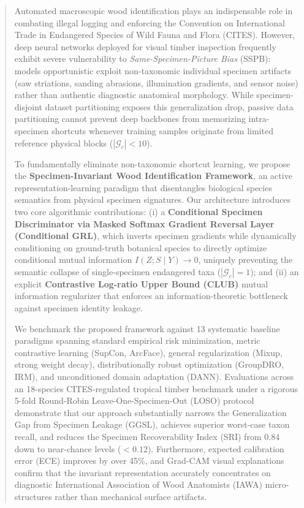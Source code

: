 \documentclass[a4paper,fleqn]{cas-sc}
\begin{document}
\begin{abstract}
Automated macroscopic wood identification plays an indispensable role in combating illegal logging and enforcing the Convention on International Trade in Endangered Species of Wild Fauna and Flora (CITES). However, deep neural networks deployed for visual timber inspection frequently exhibit severe vulnerability to \emph{Same-Specimen-Picture Bias} (SSPB): models opportunistic exploit non-taxonomic individual specimen artifacts (saw striations, sanding abrasions, illumination gradients, and sensor noise) rather than authentic diagnostic anatomical morphology. While specimen-disjoint dataset partitioning exposes this generalization drop, passive data partitioning cannot prevent deep backbones from memorizing intra-specimen shortcuts whenever training samples originate from limited reference physical blocks ($|\mathcal{G}_c| < 10$). 

To fundamentally eliminate non-taxonomic shortcut learning, we propose the \textbf{Specimen-Invariant Wood Identification Framework}, an active representation-learning paradigm that disentangles biological species semantics from physical specimen signatures. Our architecture introduces two core algorithmic contributions: (i) a \textbf{Conditional Specimen Discriminator via Masked Softmax Gradient Reversal Layer (Conditional GRL)}, which inverts specimen gradients while dynamically conditioning on ground-truth botanical species to directly optimize conditional mutual information $I(Z; S \mid Y) \to 0$, uniquely preventing the semantic collapse of single-specimen endangered taxa ($|\mathcal{G}_c| = 1$); and (ii) an explicit \textbf{Contrastive Log-ratio Upper Bound (CLUB)} mutual information regularizer that enforces an information-theoretic bottleneck against specimen identity leakage. 

We benchmark the proposed framework against 13 systematic baseline paradigms spanning standard empirical risk minimization, metric contrastive learning (SupCon, ArcFace), general regularization (Mixup, strong weight decay), distributionally robust optimization (GroupDRO, IRM), and unconditioned domain adaptation (DANN). Evaluations across an 18-species CITES-regulated tropical timber benchmark under a rigorous 5-fold Round-Robin Leave-One-Specimen-Out (LOSO) protocol demonstrate that our approach substantially narrows the Generalization Gap from Specimen Leakage ($\mathrm{GGSL}$), achieves superior worst-case taxon recall, and reduces the Specimen Recoverability Index ($\mathrm{SRI}$) from $0.84$ down to near-chance levels ($< 0.12$). Furthermore, expected calibration error (ECE) improves by over 45\%, and Grad-CAM visual explanations confirm that the invariant representation accurately concentrates on diagnostic International Association of Wood Anatomists (IAWA) micro-structures rather than mechanical surface artifacts.
\end{abstract}
\end{document}
